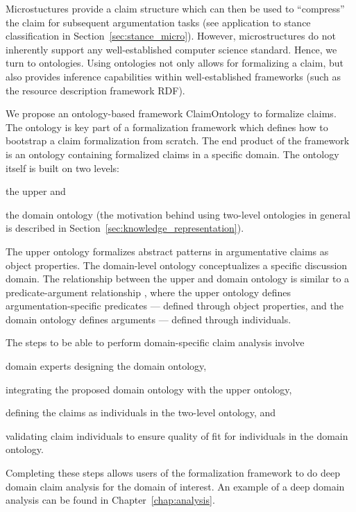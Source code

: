 Microstuctures provide a claim structure which can then be used 
to ``compress'' the claim for subsequent argumentation tasks
(see application to stance classification in Section~\ref{sec:stance_micro}).
However, microstructures do not inherently support any
well-established computer science standard. 
Hence, we turn to ontologies. Using ontologies not only allows for 
formalizing a claim, but also provides inference capabilities within
well-established frameworks (such as the resource description framework RDF). 

We propose an ontology-based framework ClaimOntology to formalize claims. The
ontology is key part of a formalization framework which defines how to
bootstrap a claim formalization from scratch. The end product of the framework
is an ontology containing formalized claims in a specific domain. 
The ontology itself is built on two levels: 
\begin{enumerate*}[label=(\arabic*)]
\item the upper and 
\item the domain ontology 
(the motivation behind using two-level ontologies in general is described in
		Section~\ref{sec:knowledge_representation}). 
\end{enumerate*}
The upper ontology formalizes abstract patterns in argumentative
claims as object properties. The domain-level ontology conceptualizes 
a specific discussion domain. The relationship between the upper 
and domain ontology is similar to a predicate-argument
relationship \citep{hindle1990noun}, where the upper ontology
defines argumentation-specific predicates --- defined through object properties, 
and the domain ontology defines arguments --- defined through 
individuals. 

The steps to be able to perform domain-specific claim analysis
involve
\begin{enumerate*}[label=(\arabic*)]
\item domain experts designing the domain ontology,
\item integrating the proposed domain ontology with the upper ontology,
\item defining the claims as individuals in the two-level ontology, and
\item validating claim individuals to ensure quality of fit for
	individuals in the domain ontology.
\end{enumerate*}
Completing these steps allows users of the formalization framework
to do deep domain claim analysis for the domain of interest. 
An example of a deep domain analysis can be found in Chapter~\ref{chap:analysis}.


